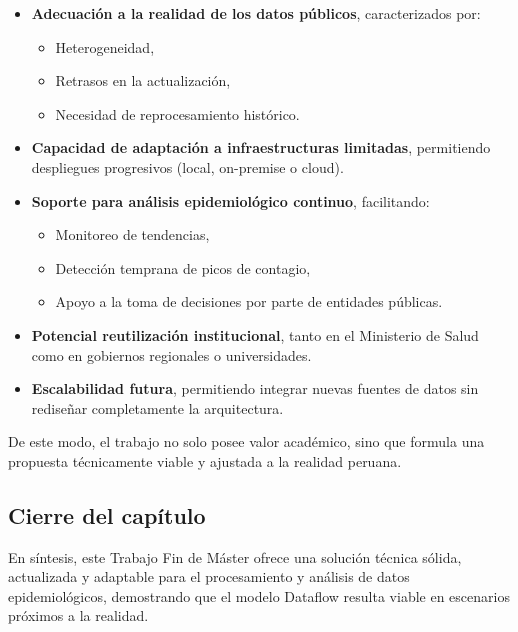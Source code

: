 \documentclass[12pt,a4paper]{article}
\providecommand{\tightlist}{%
  \setlength{\itemsep}{0pt}\setlength{\parskip}{0pt}}
\begin{document}
\begin{itemize}
    \item
          \textbf{Adecuación a la realidad de los datos públicos}, caracterizados por:

          \begin{itemize}
              \tightlist
              \item
                    Heterogeneidad,
              \item
                    Retrasos en la actualización,
              \item
                    Necesidad de reprocesamiento histórico.
          \end{itemize}
    \item
          \textbf{Capacidad de adaptación a infraestructuras limitadas}, permitiendo despliegues progresivos (local, on-premise o cloud).
    \item
          \textbf{Soporte para análisis epidemiológico continuo}, facilitando:

          \begin{itemize}
              \tightlist
              \item
                    Monitoreo de tendencias,
              \item
                    Detección temprana de picos de contagio,
              \item
                    Apoyo a la toma de decisiones por parte de entidades públicas.
          \end{itemize}
    \item
          \textbf{Potencial reutilización institucional}, tanto en el Ministerio de Salud como en gobiernos regionales o universidades.
    \item
          \textbf{Escalabilidad futura}, permitiendo integrar nuevas fuentes de datos sin rediseñar completamente la arquitectura.
\end{itemize}

De este modo, el trabajo no solo posee valor académico, sino que formula una propuesta técnicamente viable y ajustada a la realidad peruana.

\subsection{Cierre del capítulo}\label{cierre-del-capuxedtulo}

En síntesis, este Trabajo Fin de Máster ofrece una solución técnica sólida, actualizada y adaptable para el procesamiento y análisis de datos epidemiológicos, demostrando que el modelo Dataflow resulta viable en escenarios próximos a la realidad.
\end{document}
